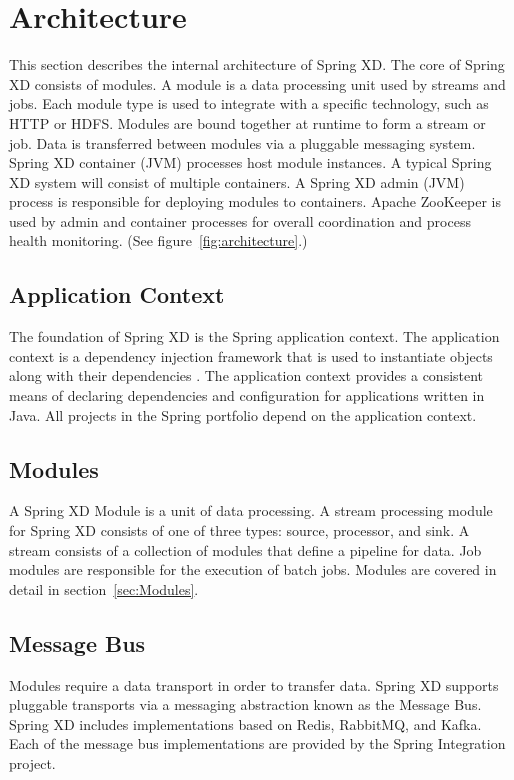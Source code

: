 \section{Architecture}
This section describes the internal architecture of Spring XD. The core of
Spring XD consists of modules. A module is a data processing unit used by
streams and jobs. Each module type is used to integrate with a specific
technology, such as HTTP or HDFS. Modules are bound together at runtime
to form a stream or job. Data is transferred between modules via a pluggable
messaging system. Spring XD container (JVM) processes host module instances.
A typical Spring XD system will consist of multiple containers. A Spring XD
admin (JVM) process is responsible for deploying modules to containers.
Apache ZooKeeper\cite{zookeeper} is used by admin and container processes
for overall coordination and process health monitoring. 
(See figure~\ref{fig:architecture}.)

\subsection{Application Context}
The foundation of Spring XD is the Spring application context. The application
context is a dependency injection framework that is used to instantiate
objects along with their dependencies \cite{spring-framework-reference}.
The application context provides a consistent means of declaring dependencies
and configuration for applications written in Java. All projects in the
Spring\cite{spring} portfolio depend on the application context.

\subsection{Modules}
A Spring XD Module is a unit of data processing. A stream processing module
for Spring XD consists of one of three types: source, processor, and sink.
A stream consists of a collection of modules that define a pipeline for data.
Job modules are responsible for the execution of batch jobs. Modules are
covered in detail in section~\ref{sec:Modules}.

\subsection{Message Bus}
\label{subsec:MessageBus}
Modules require a data transport in order to transfer data. Spring XD
supports pluggable transports via a messaging abstraction known as 
the Message Bus. Spring XD includes implementations based on Redis\cite{redis}, 
RabbitMQ\cite{rabbitmq}, and Kafka. Each of the message bus implementations are provided 
by the Spring Integration project.

